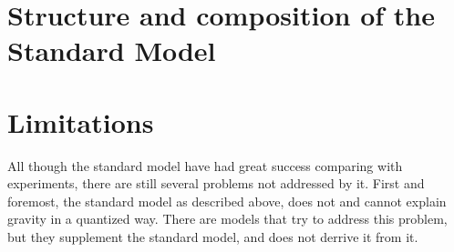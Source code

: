 \section*{Structure and  composition of the Standard Model}



\section*{Limitations}
All though the standard model have had great success comparing with experiments,
there are still several problems not addressed by it. First and foremost, the standard model
as described above, does not and cannot explain gravity in a quantized way. There 
are models that try to address this problem, but they supplement the standard model,
and does not derrive it from it. 

